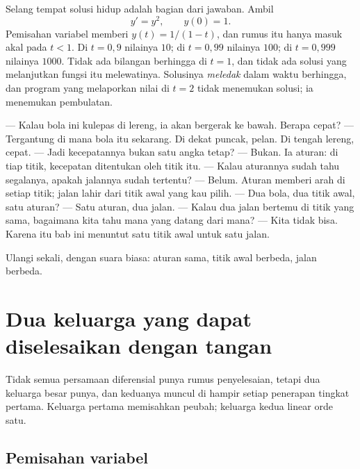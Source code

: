 Selang tempat solusi hidup adalah bagian dari jawaban. Ambil
\[
y'=y^{2},\qquad y(0)=1 .
\]
Pemisahan variabel memberi $y(t)=1/(1-t)$, dan rumus itu hanya masuk akal pada
$t<1$. Di $t=0{,}9$ nilainya $10$; di $t=0{,}99$ nilainya $100$; di $t=0{,}999$ nilainya
$1000$. Tidak ada bilangan berhingga di $t=1$, dan tidak ada solusi yang
melanjutkan fungsi itu melewatinya. Solusinya \emph{meledak} dalam waktu
berhingga, dan program yang melaporkan nilai di $t=2$ tidak menemukan solusi; ia
menemukan pembulatan.



\begin{bacakeras}
--- Kalau bola ini kulepas di lereng, ia akan bergerak ke bawah. Berapa cepat?
--- Tergantung di mana bola itu sekarang. Di dekat puncak, pelan. Di tengah
lereng, cepat.
--- Jadi kecepatannya bukan satu angka tetap?
--- Bukan. Ia aturan: di tiap titik, kecepatan ditentukan oleh titik itu.
--- Kalau aturannya sudah tahu segalanya, apakah jalannya sudah tertentu?
--- Belum. Aturan memberi arah di setiap titik; jalan lahir dari titik awal yang
kau pilih.
--- Dua bola, dua titik awal, satu aturan?
--- Satu aturan, dua jalan.
--- Kalau dua jalan bertemu di titik yang sama, bagaimana kita tahu mana yang
datang dari mana?
--- Kita tidak bisa. Karena itu bab ini menuntut satu titik awal untuk satu
jalan.

Ulangi sekali, dengan suara biasa: aturan sama, titik awal berbeda, jalan berbeda.
\end{bacakeras}

\section{Dua keluarga yang dapat diselesaikan dengan tangan}

Tidak semua persamaan diferensial punya rumus penyelesaian, tetapi dua keluarga
besar punya, dan keduanya muncul di hampir setiap penerapan tingkat pertama.
Keluarga pertama memisahkan peubah; keluarga kedua linear orde satu.

\subsection{Pemisahan variabel}

